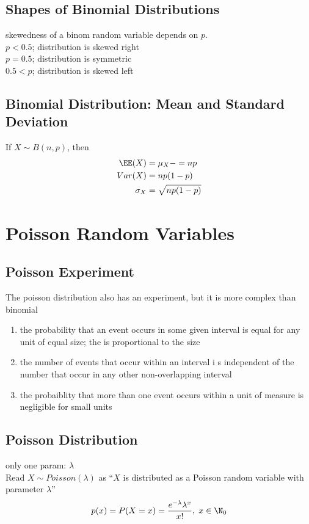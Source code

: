 \subsection{Shapes of Binomial Distributions}
skewedness of a binom random variable depends on $p$. \\
$p<0.5$; distribution is skewed right \\
$p=0.5$; distribution is symmetric  \\
$0.5<p$; distribution is skewed left


\subsection{Binomial Distribution: Mean and Standard Deviation}
If $X\sim B(n,p)$, then
\begin{align}
    \EE(X)&=\mu_X-=np\\
    Var(X)&=np(1-p)\\
    \sigma_X&=\sqrt{np(1-p)}
\end{align}

\section{Poisson Random Variables}  %


\subsection{Poisson Experiment}  %
The poisson distribution also has an experiment, but it is more complex than  binomial
\begin{enumerate}
    \item the probability that an event occurs in some given interval is equal for any unit of equal size; the  is proportional to the size
    \item the number of events that occur within an interval i s independent of the number that occur in any other non-overlapping interval
    \item the probaiblity that more than one event occurs within a unit of measure is negligible for small units
\end{enumerate}

\subsection{Poisson Distribution}  %
only one param: $\lambda$ \\
Read $X\sim Poisson(\lambda)$ as ``$X$ is distributed as a Poisson random variable with parameter $\lambda$''
\begin{equation}
    p(x)=P(X=x)=\frac{e^{-\lambda}\lambda^x}{x!},\; x\in\N_0
\end{equation}

